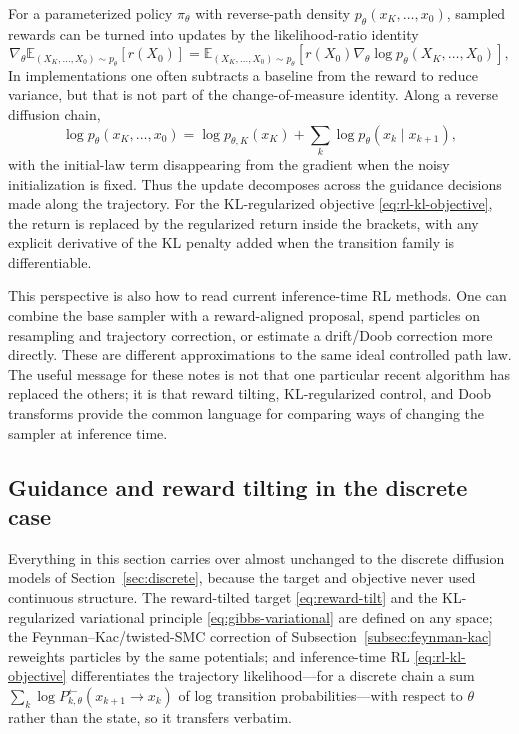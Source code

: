 \documentclass{amsart}
\numberwithin{equation}{section}
\theoremstyle{plain}
\theoremstyle{definition}
\theoremstyle{remark}
\newcommand{\E}{\mathbb{E}}
\begin{document}
For a parameterized policy $\pi_\theta$ with reverse-path density
$p_\theta(x_K,\ldots,x_0)$, sampled rewards can be turned into updates by the
likelihood-ratio identity
\[
    \nabla_\theta\E_{(X_K,\ldots,X_0)\sim p_\theta}[r(X_0)]
    =
    \E_{(X_K,\ldots,X_0)\sim p_\theta}
    \left[
    r(X_0)\nabla_\theta\log p_\theta(X_K,\ldots,X_0)
    \right],
\]
In implementations one often subtracts a baseline from the reward to reduce
variance, but that is not part of the change-of-measure identity.  Along a
reverse diffusion chain,
\[
    \log p_\theta(x_K,\ldots,x_0)
    =
    \log p_{\theta,K}(x_K)
    +
    \sum_k \log p_\theta(x_k\mid x_{k+1}),
\]
with the initial-law term disappearing from the gradient when the noisy
initialization is fixed.  Thus the update decomposes across the guidance
decisions made along the trajectory.
For the KL-regularized objective \eqref{eq:rl-kl-objective}, the
return is replaced by the regularized return inside the brackets, with any
explicit derivative of the KL penalty added when the transition family is
differentiable.

This perspective is also how to read current inference-time RL methods.
One can combine the base sampler with a reward-aligned proposal, spend particles
on resampling and trajectory correction, or estimate a drift/Doob correction
more directly.  These are different approximations to the same ideal controlled
path law.  The useful message for these notes is not that one particular recent
algorithm has replaced the others; it is that reward tilting, KL-regularized
control, and Doob transforms provide the common language for comparing ways of
changing the sampler at inference time.

\subsection{Guidance and reward tilting in the discrete case}

Everything in this section carries over almost unchanged to the discrete
diffusion models of Section~\ref{sec:discrete}, because the target and objective
never used continuous structure.  The
reward-tilted target \eqref{eq:reward-tilt} and the KL-regularized variational
principle \eqref{eq:gibbs-variational} are defined on any space; the
Feynman--Kac/twisted-SMC correction of Subsection~\ref{subsec:feynman-kac}
reweights particles by the same potentials; and inference-time RL
\eqref{eq:rl-kl-objective} differentiates the trajectory
likelihood---for a discrete chain a sum
$\sum_k\log P_{k,\theta}^{\leftarrow}(x_{k+1}\to x_k)$ of log transition
probabilities---with respect to $\theta$ rather than the state, so it transfers
verbatim.
\end{document}
